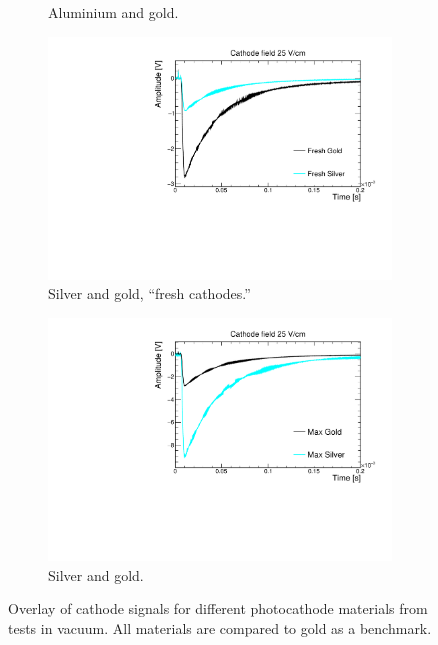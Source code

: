 \documentclass[a4paper,11pt]{article}
\begin{document}
\begin{figure}[tb]
\begin{subfigure}[h]{0.45\textwidth}
        \caption{Aluminium and gold.}
        \label{fig:aluminium}
    \end{subfigure}
    \hfill
    \begin{subfigure}[h]{0.45\textwidth}\centering\centering\captionsetup{singlelinecheck = false, format= hang, justification=raggedright, font=footnotesize, labelsep=space}
            \includegraphics[scale=0.35]{figures/FirstSilverVSGold_25Vcm.pdf}
        \caption{Silver and gold, ``fresh cathodes.''}
        \label{fig:freshSilver}
    \end{subfigure}
    \hfill
    \begin{subfigure}[h]{0.45\textwidth}\centering\centering\captionsetup{singlelinecheck = false, format= hang, justification=raggedright, font=footnotesize, labelsep=space}
            \includegraphics[scale=0.35]{figures/MaxSilverVSGold_25Vcm.pdf}
        \caption{Silver and gold.}
        \label{fig:maxSilver}
    \end{subfigure}
    \caption{Overlay of cathode signals for different photocathode materials from tests in vacuum. All materials are compared to gold as a benchmark.}
\end{figure}
\end{document}
